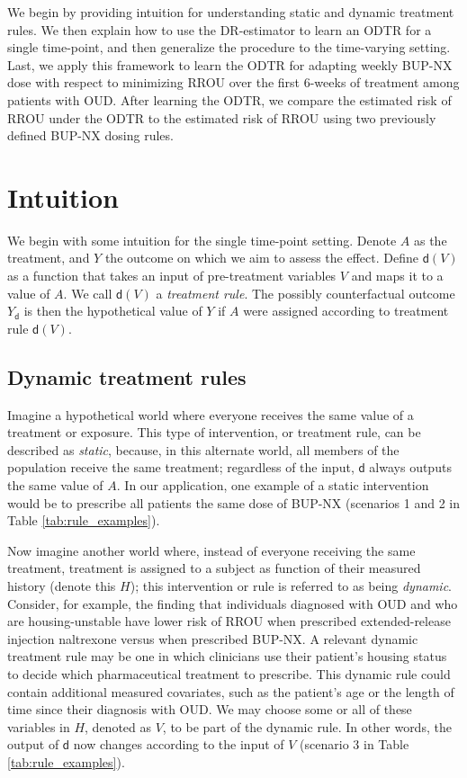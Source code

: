\documentclass[11pt]{article}
\renewcommand{\d}{\mathsf{d}}
\theoremstyle{example}
\begin{document}
We begin by providing intuition for understanding static and dynamic treatment rules. We then explain how to use the DR-estimator to learn an ODTR for a single time-point, and then generalize the procedure to the time-varying setting. Last, we apply this framework to learn the ODTR for adapting weekly BUP-NX dose with respect to minimizing RROU over the first 6-weeks of treatment among patients with OUD. After learning the ODTR, we compare the estimated risk of RROU under the ODTR to the estimated risk of RROU using two previously defined BUP-NX dosing rules.\citep{rudolph2022dose}

\section*{Intuition}

We begin with some intuition for the single time-point setting. Denote $A$ as the treatment, and $Y$ the outcome on which we aim to assess the effect. Define $\d(V)$ as a function that takes an input of pre-treatment variables $V$ and maps it to a value of $A$. We call $\d(V)$ a \emph{treatment rule}. The possibly counterfactual outcome $Y_\d$ is then the hypothetical value of $Y$ if $A$ were assigned according to treatment rule $\d(V)$.

\subsection*{Dynamic treatment rules}

Imagine a hypothetical world where everyone receives the same value of a treatment or exposure. This type of intervention, or treatment rule, can be described as \emph{static}, because, in this alternate world, all members of the population receive the same treatment; regardless of the input, $\d$ always outputs the same value of $A$. In our application, one example of a static intervention would be to prescribe all patients the same dose of BUP-NX (scenarios 1 and 2 in Table \ref{tab:rule_examples}).

Now imagine another world where, instead of everyone receiving the same treatment, treatment is assigned to a subject as function of their measured history (denote this $H$); this intervention or rule is referred to as being \emph{dynamic}.\citep{hernanWhatIfDynamic} Consider, for example, the finding that individuals diagnosed with OUD and who are housing-unstable have lower risk of RROU when prescribed extended-release injection naltrexone versus when prescribed BUP-NX.\cite{rudolph2021optimizing} A relevant dynamic treatment rule may be one in which clinicians use their patient's housing status to decide which pharmaceutical treatment to prescribe. This dynamic rule could contain additional measured covariates, such as the patient's age or the length of time since their diagnosis with OUD. We may choose some or all of these variables in $H$, denoted as $V$, to be part of the dynamic rule. In other words, the output of $\d$ now changes according to the input of $V$ (scenario 3 in Table \ref{tab:rule_examples}). 
\end{document}

